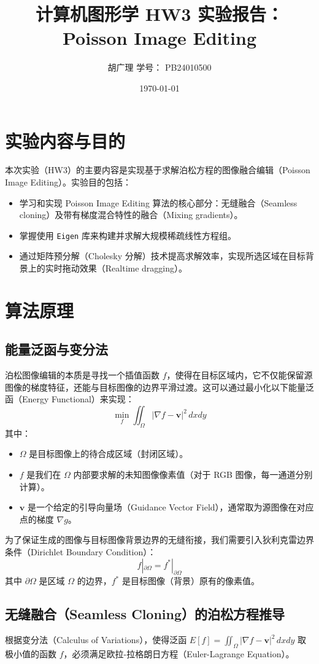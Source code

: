 \documentclass[12pt,a4paper]{ctexart}
\title{计算机图形学 HW3 实验报告：Poisson Image Editing}
\author{胡广理  学号： PB24010500}
\date{\today}
\begin{document}
\maketitle

\section{实验内容与目的}
本次实验（HW3）的主要内容是实现基于求解泊松方程的图像融合编辑（Poisson Image Editing）。实验目的包括：
\begin{itemize}
    \item 学习和实现 Poisson Image Editing 算法的核心部分：无缝融合（Seamless cloning）及带有梯度混合特性的融合（Mixing gradients）。
    \item 掌握使用 \texttt{Eigen} 库来构建并求解大规模稀疏线性方程组。
    \item 通过矩阵预分解（Cholesky 分解）技术提高求解效率，实现所选区域在目标背景上的实时拖动效果（Realtime dragging）。
\end{itemize}

\section{算法原理}

\subsection{能量泛函与变分法}
泊松图像编辑的本质是寻找一个插值函数 $f$，使得在目标区域内，它不仅能保留源图像的梯度特征，还能与目标图像的边界平滑过渡。这可以通过最小化以下能量泛函（Energy Functional）来实现：
$$ \min_{f} \iint_{\Omega} |\nabla f - \mathbf{v}|^2 \, dx dy $$
其中：
\begin{itemize}
    \item $\Omega$ 是目标图像上的待合成区域（封闭区域）。
    \item $f$ 是我们在 $\Omega$ 内部要求解的未知图像像素值（对于 RGB 图像，每一通道分别计算）。
    \item $\mathbf{v}$ 是一个给定的引导向量场（Guidance Vector Field），通常取为源图像在对应点的梯度 $\nabla g$。
\end{itemize}

为了保证生成的图像与目标图像背景边界的无缝衔接，我们需要引入狄利克雷边界条件（Dirichlet Boundary Condition）：
$$ f|_{\partial\Omega} = f^*|_{\partial\Omega} $$
其中 $\partial\Omega$ 是区域 $\Omega$ 的边界，$f^*$ 是目标图像（背景）原有的像素值。

\subsection{无缝融合（Seamless Cloning）的泊松方程推导}
根据变分法（Calculus of Variations），使得泛函 $E[f] = \iint_{\Omega} |\nabla f - \mathbf{v}|^2 \, dx dy$ 取极小值的函数 $f$，必须满足欧拉-拉格朗日方程（Euler-Lagrange Equation）。
\end{document}
